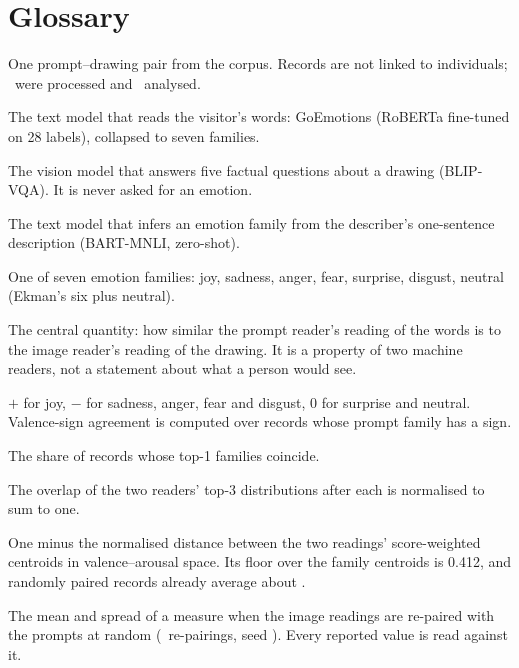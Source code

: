 \chapter*{Glossary}


\begin{description}\setlength{\itemsep}{2pt}
\item[Record] One prompt--drawing pair from the corpus. Records are not linked to individuals; \nTotal\ were processed and \nAnalysed\ analysed.
\item[Prompt reader] The text model that reads the visitor's words: GoEmotions (RoBERTa fine-tuned on 28 labels), collapsed to seven families.
\item[Describer] The vision model that answers five factual questions about a drawing (BLIP-VQA). It is never asked for an emotion.
\item[Image reader] The text model that infers an emotion family from the describer's one-sentence description (BART-MNLI, zero-shot).
\item[Family] One of seven emotion families: joy, sadness, anger, fear, surprise, disgust, neutral (Ekman's six plus neutral).
\item[Agreement] The central quantity: how similar the prompt reader's reading of the words is to the image reader's reading of the drawing. It is a property of two machine readers, not a statement about what a person would see.
\item[Valence sign] $+$ for joy, $-$ for sadness, anger, fear and disgust, $0$ for surprise and neutral. Valence-sign agreement is computed over records whose prompt family has a sign.
\item[Family agreement] The share of records whose top-1 families coincide.
\item[Top-3 soft overlap] The overlap of the two readers' top-3 distributions after each is normalised to sum to one.
\item[Valence--arousal similarity] One minus the normalised distance between the two readings' score-weighted centroids in valence--arousal space. Its floor over the family centroids is 0.412, and randomly paired records already average about \FullNeuVaNull.
\item[Random-pairing null] The mean and spread of a measure when the image readings are re-paired with the prompts at random (\nullShuffles\ re-pairings, seed \nullSeed). Every reported value is read against it.

\end{description}
